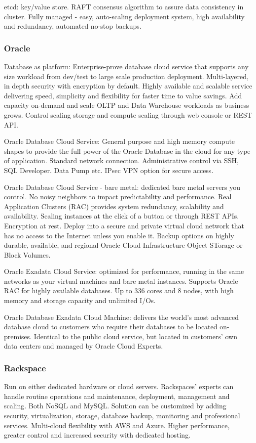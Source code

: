 etcd: key/value store. RAFT consensus algorithm to assure data consistency in cluster. Fully managed - easy, auto-scaling deployment system, high availability and redundancy, automated no-stop backups.  

\subsubsection{Oracle}
Database as platform: Enterprise-prove database cloud service that supports any size workload from dev/test to large scale production deployment. Multi-layered, in depth security with encryption by default. Highly available and scalable service delivering speed, simplicity and flexibility for faster time to value savings. Add capacity on-demand and scale OLTP and Data Warehouse workloads as business grows. Control scaling storage and compute scaling through web console or REST API. 

Oracle Database Cloud Service: General purpose and high memory compute shapes to provide the full power of the Oracle Database in the cloud for any type of application. Standard network connection. Administrative control via SSH, SQL Developer. Data Pump etc. IPsec VPN option for secure access. 

Oracle Database Cloud Service - bare metal: dedicated bare metal servers you control. No noisy neighbors to impact predictability and performance. Real Application Clusters (RAC) provides system redundancy, scalability and availability. Scaling instances at the click of a button or through REST APIs. Encryption at rest. Deploy into a secure and private virtual cloud network that has no access to the Internet unless you enable it. Backup options on highly durable, available, and regional Oracle Cloud Infrastructure Object STorage or Block Volumes. 

Oracle Exadata Cloud Service: optimized for performance, running in the same networks as your virtual machines and bare metal instances. Supports Oracle RAC for highly available databases. Up to 336 cores and 8 nodes, with high memory and storage capacity and unlimited I/Os. 

Oracle Database Exadata Cloud Machine: delivers the world's most advanced database cloud to customers who require their databases to be located on-premises. Identical to the public cloud service, but located in customers' own data centers and managed by Oracle Cloud Experts. 

\subsubsection{Rackspace}
Run on either dedicated hardware or cloud servers. Rackspaces' experts can handle routine operations and maintenance, deployment, management and scaling. Both NoSQL and MySQL. Solution can be customized by adding security, virtualization, storage, database backup, monitoring and professional services. Multi-cloud flexibility with AWS and Azure. Higher performance, greater control and increased security with dedicated hosting.  

